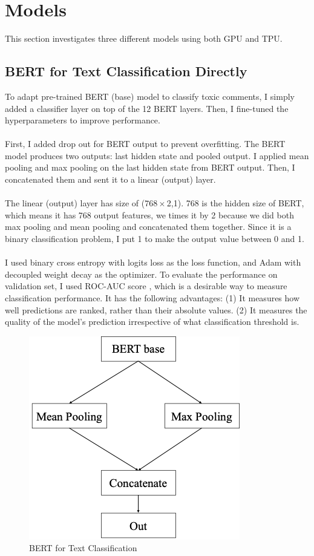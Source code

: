\documentclass[11pt,a4paper]{article}
\begin{document}
\section{Models}

This section  investigates three different models using both GPU and TPU.

\subsection{BERT for Text Classification Directly}

To adapt pre-trained BERT (base) model to classify toxic comments, I simply added a classifier layer on top of the 12 BERT layers. Then, I fine-tuned the hyperparameters to improve performance.\\
\\
First, I added drop out for BERT output to prevent overfitting. The BERT model produces two outputs: last hidden state and pooled output. I applied mean pooling and max pooling on the last hidden state from BERT output. Then, I concatenated them and sent it to a linear (output) layer. \\
\\
The linear (output) layer has size of ($768 \times $2,1). 768 is the hidden size of BERT, which means it has 768 output features, we times it by 2 because we did both max pooling and mean pooling and concatenated them together. Since it is a binary classification problem, I put 1 to make the output value between 0 and 1.\\
\\
I used binary cross entropy with logits loss as the loss function, and Adam with decoupled weight decay \cite{weight} as the optimizer. To evaluate the performance on validation set, I used ROC-AUC score \cite{roc}, which is a desirable way to measure classification performance.  It has the following advantages: (1) It measures how well predictions are ranked, rather than their absolute values. (2) It measures the quality of the model's prediction irrespective of what classification threshold is.\\

\begin{figure}[!htbp]
	\centering
	\includegraphics{figures/figure4.png}
	\caption{\label{fig:my-label} BERT for Text Classification}
\end{figure}
\end{document}
